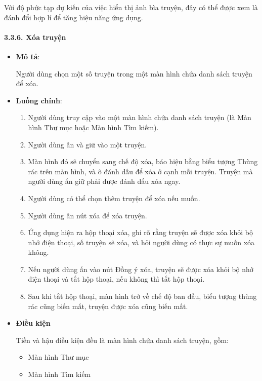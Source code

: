 Với độ phức tạp dự kiến của việc hiển thị ảnh bìa truyện, đây có thể
được xem là đánh đổi hợp lí để tăng hiệu năng ứng dụng.

\hypertarget{xuxf3a-truyux1ec7n}{%
  \paragraph{\texorpdfstring{3.3.6. Xóa truyện
    }{3.3.6. Xóa truyện }}\label{xuxf3a-truyux1ec7n}}

\begin{itemize}
  \item
        \textbf{Mô tả}:

        Người dùng chọn một số truyện trong một màn hình chứa danh sách truyện
        để xóa.
  \item
        \textbf{Luồng chính}:

        \begin{enumerate}
          \def\labelenumi{\arabic{enumi}.}
          
          \item
                Người dùng truy cập vào một màn hình chứa danh sách truyện (là Màn
                hình Thư mục hoặc Màn hình Tìm kiếm).
          \item
                Người dùng ấn và giữ vào một truyện.
          \item
                Màn hình đó sẽ chuyển sang chế độ xóa, báo hiệu bằng biểu tượng
                Thùng rác trên màn hình, và ô đánh dấu để xóa ở cạnh mỗi truyện.
                Truyện mà người dùng ấn giữ phải được đánh dấu xóa ngay.
          \item
                Người dùng có thể chọn thêm truyện để xóa nếu muốn.
          \item
                Người dùng ấn nút xóa để xóa truyện.
          \item
                Ứng dụng hiện ra hộp thoại xóa, ghi rõ rằng truyện sẽ được xóa khỏi
                bộ nhớ điện thoại, số truyện sẽ xóa, và hỏi người dùng có thực sự
                muốn xóa không.
          \item
                Nếu người dùng ấn vào nút Đồng ý xóa, truyện sẽ được xóa khỏi bộ nhớ
                điện thoại và tắt hộp thoại, nếu không thì tắt hộp thoại.
          \item
                Sau khi tắt hộp thoại, màn hình trở về chế độ ban đầu, biểu tượng
                thùng rác cũng biến mất, truyện được xóa cũng biến mất.
        \end{enumerate}
  \item
        \textbf{Điều kiện}

        Tiền và hậu điều kiện đều là màn hình chứa danh sách truyện, gồm:

        \begin{itemize}
          
          \item
                Màn hình Thư mục
          \item
                Màn hình Tìm kiếm
        \end{itemize}
\end{itemize}

